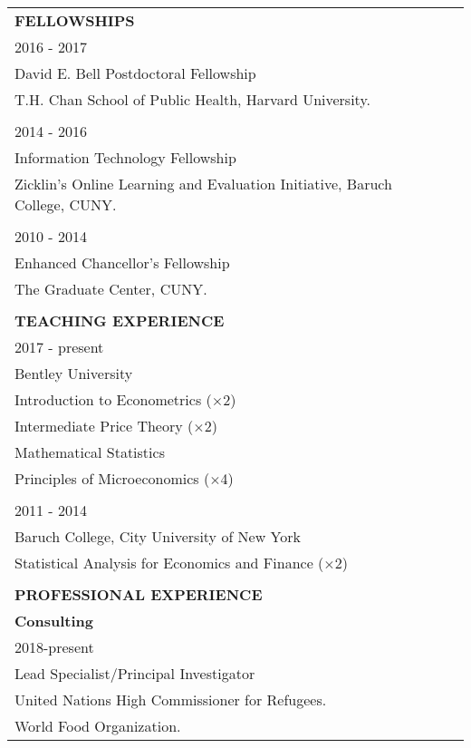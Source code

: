 \documentclass[12 pt]{article}
\begin{document}
\begin{longtable}{ccccc}
 \\



 \multicolumn{5}{l}{\textbf{FELLOWSHIPS}}\\[2 pt] 
 \multicolumn{4}{l}{2016 - 2017} \\
 \multicolumn{4}{l}{David E. Bell Postdoctoral Fellowship} \\
\multicolumn{4}{l}{T.H. Chan School of Public Health, Harvard University.}   \\
\\
 \multicolumn{4}{l}{2014 - 2016} \\
 \multicolumn{4}{l}{Information Technology Fellowship} \\
\multicolumn{4}{l}{Zicklin's Online Learning and Evaluation Initiative, Baruch College, CUNY.}   \\
\\
 \multicolumn{4}{l}{2010 - 2014} \\
 \multicolumn{4}{l}{Enhanced Chancellor's Fellowship}  \\
\multicolumn{4}{l}{The Graduate Center, CUNY.}   \\

\\


 \multicolumn{5}{l}{\textbf{TEACHING EXPERIENCE}}\\[2 pt] 
  \multicolumn{4}{l}{2017 - present} \\
\multicolumn{4}{l}{Bentley University}   \\
 \multicolumn{4}{l}{Introduction to Econometrics ($\times$2)}      \\
  \multicolumn{4}{l}{Intermediate Price Theory ($\times$2)}    \\
 \multicolumn{4}{l}{Mathematical Statistics}      \\
\multicolumn{4}{l}{Principles of Microeconomics ($\times$4)} \\

\\
 \multicolumn{4}{l}{2011 - 2014} \\
\multicolumn{4}{l}{Baruch College, City University of New York}     \\

\multicolumn{4}{l}{Statistical Analysis for Economics and Finance ($\times$2)}        \\

\\

\multicolumn{5}{l}{\textbf{PROFESSIONAL EXPERIENCE}}\\[2 pt] 
\multicolumn{4}{l}{\textbf{Consulting}} \\ 
\multicolumn{4}{l}{2018-present} \\ 
\multicolumn{4}{l}{Lead Specialist/Principal Investigator}    \\
\multicolumn{4}{l}{United Nations High Commissioner for Refugees.}   \\
\multicolumn{4}{l}{World Food Organization.}   \\


\end{longtable}
\end{document}
